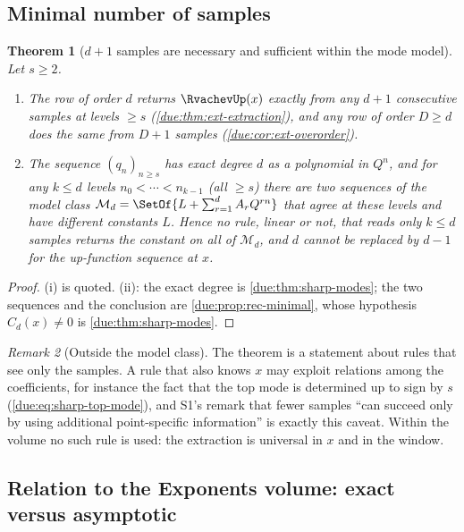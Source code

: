 \documentclass[11pt,oneside]{article}
\theoremstyle{plain}
\newtheorem{theorem}{Theorem}[section]
\theoremstyle{definition}
\theoremstyle{remark}
\newtheorem{remark}[theorem]{Remark}
\newcommand{\upn}[1]{\RvachevUp_{#1}}
\newcommand{\Qq}{Q}                                         %
\newcommand{\Cr}[2]{C_{#1}\!\left(#2\right)}                %
\newcommand{\qn}[1]{q_{#1}}                                 %
\begin{document}
\subsection{Minimal number of samples}
\label{due:sec:sharp-samples}

\begin{theorem}[$d+1$ samples are necessary and sufficient within the mode model]
\label{due:thm:sharp-samples}
Let $s\ge2$.
\begin{enumerate}[label=\textup{(\roman*)}]
\item The row of order $d$ returns $\RvachevUp(x)$ exactly from any $d+1$
 consecutive samples at levels $\ge s$ (\cref{due:thm:ext-extraction}), and
 any row of order $D\ge d$ does the same from $D+1$ samples
 (\cref{due:cor:ext-overorder}).
\item The sequence $(\qn{n})_{n\ge s}$ has exact degree $d$ as a polynomial
 in $\Qq^{n}$, and for any $k\le d$ levels $n_{0}<\cdots<n_{k-1}$ (all
 $\ge s$) there are two sequences of the model class
 $\mathcal M_{d}=\SetOf{L+\sum_{r=1}^{d}A_{r}\Qq^{rn}}$ that agree at these
 levels and have different constants $L$.  Hence no rule, linear or not,
 that reads only $k\le d$ samples returns the constant on all of
 $\mathcal M_{d}$, and $d$ cannot be replaced by $d-1$ for the up-function
 sequence at $x$.
\end{enumerate}
\end{theorem}

\begin{proof}
(i) is quoted.  (ii): the exact degree is \cref{due:thm:sharp-modes}; the
two sequences and the conclusion are
\cref{due:prop:rec-minimal}, whose hypothesis $\Cr{d}{x}\ne0$ is
\cref{due:thm:sharp-modes}.
\end{proof}

\begin{remark}[Outside the model class]
\label{due:rmk:sharp-samples-outside}
The theorem is a statement about rules that see only the samples.  A rule
that also knows $x$ may exploit relations among the coefficients, for
instance the fact that the top mode is determined up to sign by $s$
(\cref{due:eq:sharp-top-mode}), and S1's remark that fewer samples ``can
succeed only by using additional point-specific information'' is exactly
this caveat.  Within the volume no such rule is used: the extraction is
universal in $x$ and in the window.
\end{remark}

\subsection{Relation to the Exponents volume: exact versus asymptotic}
\label{due:sec:sharp-exponents}
\end{document}
